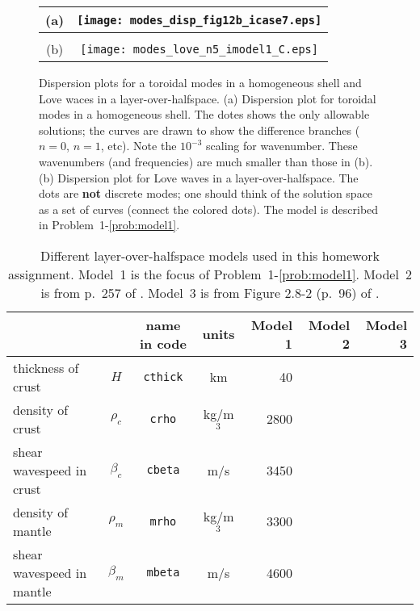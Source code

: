 \documentclass[11pt,titlepage,fleqn]{article}
\begin{document}
\clearpage\pagebreak
\begin{figure}
\centering
\begin{tabular}{cc}
(a) & \texttt{[image: modes\_disp\_fig12b\_icase7.eps]} \\ \hline
& \\
(b) & \texttt{[image: modes\_love\_n5\_imodel1\_C.eps]} 
\end{tabular}
\caption[]
{{
Dispersion plots for a toroidal modes in a homogeneous shell and Love waces in a layer-over-halfspace.
(a) Dispersion plot for toroidal modes in a homogeneous shell. The dotes shows the only allowable solutions; the curves are drawn to show the difference branches ($n=0$, $n=1$, etc). 
Note the $10^{-3}$ scaling for wavenumber. These wavenumbers (and frequencies) are much smaller than those in (b).
(b) Dispersion plot for Love waves in a layer-over-halfspace. The dots are {\bf not} discrete modes; one should think of the solution space as a set of curves (\ie connect the colored dots).
The model is described in Problem~1-\ref{prob:model1}.
\label{fig:dots}
}}
\end{figure}

\clearpage\pagebreak

\pagestyle{empty}

\begin{table}
\vspace{-3cm}
\centering
\caption[]
{{
Different layer-over-halfspace models used in this homework assignment.
Model~1 is the focus of Problem~1-\ref{prob:model1}.
Model~2 is from p.~257 of \citet{AkiRichardsE2}.
Model~3 is from  Figure 2.8-2 (p.~96) of \citet{SteinWysession}.
\label{tab:models}
}}
\begin{spacing}{1.5}
\begin{tabular}{||l|c|c|c|r|r|r||}
\hline\hline
& & name in code & units & Model 1 & Model 2 & Model 3 \\
\hline\hline
thickness of crust        & $H$       & \verb+cthick+ & km       & 40 & & \\ \hline
density of crust          & $\rho_c$  & \verb+crho+   & kg/m$^3$ & 2800 & & \\ \hline
shear wavespeed in crust  & $\beta_c$ & \verb+cbeta+  & m/s      & 3450 & & \\ \hline
density of mantle         & $\rho_m$  & \verb+mrho+   & kg/m$^3$ & 3300 & & \\ \hline
shear wavespeed in mantle & $\beta_m$ & \verb+mbeta+  & m/s      & 4600 & & \\
\hline\hline
\end{tabular}
\end{spacing}
\end{table}
\end{document}
